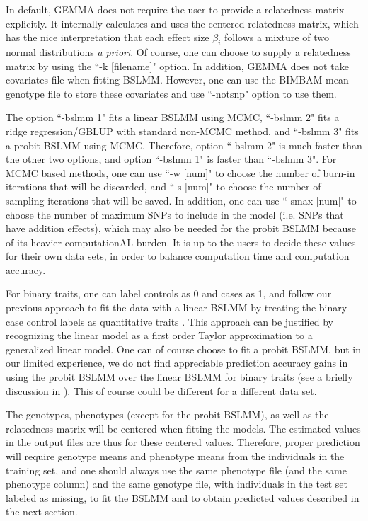 \documentclass[11pt]{article}
\begin{document}
In default, GEMMA does not require the user to provide a relatedness matrix explicitly. It internally calculates and uses the centered relatedness matrix, which has the nice interpretation that each effect size $\beta_i$ follows a mixture of two normal distributions {\it a priori}. Of course, one can choose to supply a relatedness matrix by using the ``-k [filename]" option. In addition, GEMMA does not take covariates file when fitting BSLMM. However, one can use the BIMBAM mean genotype file to store these covariates and use ``-notsnp" option to use them. 

The option ``-bslmm 1" fits a linear BSLMM using MCMC, ``-bslmm 2" fits a ridge regression/GBLUP with standard non-MCMC method, and ``-bslmm 3" fits a probit BSLMM using MCMC. Therefore, option ``-bslmm 2" is much faster than the other two options, and option ``-bslmm 1" is faster than ``-bslmm 3". For MCMC based methods, one can use ``-w [num]" to choose the number of burn-in iterations that will be discarded, and ``-s [num]" to choose the number of sampling iterations that will be saved. In addition, one can use ``-smax [num]" to choose the number of maximum SNPs to include in the model (i.e. SNPs that have addition effects), which may also be needed for the probit BSLMM because of its heavier computationAL burden. It is up to the users to decide these values for their own data sets, in order to balance computation time and computation accuracy. 

For binary traits, one can label controls as 0 and cases as 1, and follow our previous approach to fit the data with a linear BSLMM by treating the binary case control labels as quantitative traits \cite{Zhou:2013}. This approach can be justified by recognizing the linear model as a first order Taylor approximation to a generalized linear model. One can of course choose to fit a probit BSLMM, but in our limited experience, we do not find appreciable prediction accuracy gains in using the probit BSLMM over the linear BSLMM for binary traits (see a briefly discussion in \cite{Zhou:2013}). This of course could be different for a different data set.

The genotypes, phenotypes (except for the probit BSLMM), as well as the relatedness matrix will be centered when fitting the models. The estimated values in the output files are thus for these centered values. Therefore, proper prediction will require genotype means and phenotype means from the individuals in the training set, and one should always use the same phenotype file (and the same phenotype column) and the same genotype file, with individuals in the test set labeled as missing, to fit the BSLMM and to obtain predicted values described in the next section. 
\end{document}
